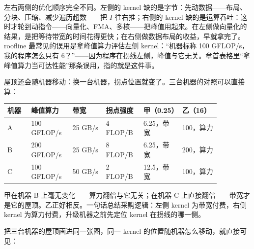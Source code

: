 左右两侧的优化顺序完全不同。左侧的 kernel 缺的是字节：先动数据——布局、分块、压缩、减少遍历趟数——把 $I$ 往右推；右侧的 kernel 缺的是运算吞吐：这时才轮到动指令——向量化、FMA、多核——把峰值用起来。在左侧做向量化的结果，是把等待带宽的时间花得更快；在右侧做数据布局的收益，早就拿完了。roofline 最常见的误用是拿峰值算力评估左侧 kernel：“机器标称 100 GFLOP/s，我的程序怎么只有 6？”——因为程序在拐线左侧，峰值与它无关。章首表格里“拿峰值算力当可达性能”那条误用，指的就是这件事。

屋顶还会随机器移动：换一台机器，拐点位置就变了。三台机器的对照可以直接算：

\begin{longtable}{L{0.10\linewidth}L{0.16\linewidth}L{0.14\linewidth}L{0.14\linewidth}L{0.16\linewidth}L{0.16\linewidth}}
\toprule
机器 & 峰值算力 & 带宽 & 拐点强度 & 甲（0.25） & 乙（16） \\
\midrule
A & 100 GFLOP/s & 25 GB/s & 4 FLOP/B & 6.25，带宽 & 100，算力 \\\tablerowrule
B & 200 GFLOP/s & 25 GB/s & 8 FLOP/B & 6.25，带宽 & 200，算力 \\\tablerowrule
C & 100 GFLOP/s & 50 GB/s & 2 FLOP/B & 12.5，带宽 & 100，算力 \\
\bottomrule
\end{longtable}

甲在机器 B 上毫无变化——算力翻倍与它无关；在机器 C 上直接翻倍——带宽才是它的屋顶。乙正好相反。一句话总结采购逻辑：左侧 kernel 为带宽付费，右侧 kernel 为算力付费，升级机器之前先定位 kernel 在拐线的哪一侧。

把三台机器的屋顶画进同一张图，同一 kernel 的位置随机器怎么移动，就直接可见：

